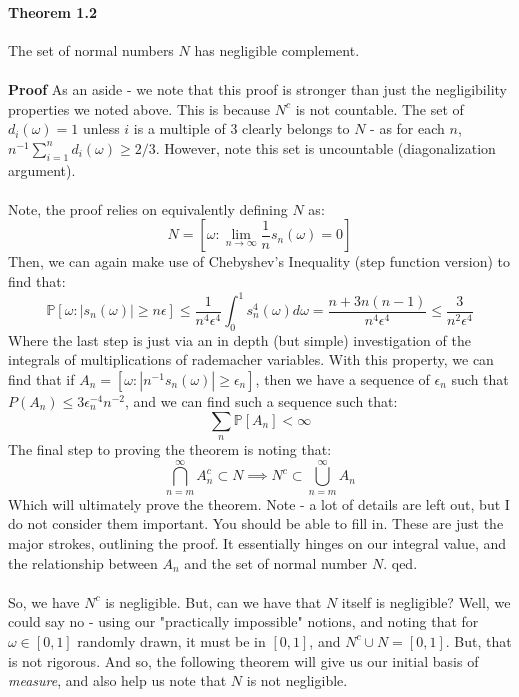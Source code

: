 \documentclass[12pt,a4paper]{article}
\newcommand{\1}[1]{\mathbbm{1}\left\{ #1 \right\}}
\newcommand{\Prob}{\mathbb{P}}
\begin{document}
\paragraph{Theorem 1.2} The set of normal numbers $N$ has negligible complement.
\\\\
\textbf{Proof} As an aside - we note that this proof is stronger than just the negligibility properties we noted above. This is because $N^c$ is not countable. The set of $d_i(\omega) = 1$ unless $i$ is a multiple of $3$ clearly belongs to $N$ - as for each $n$, $n^{-1}\sum_{i=1}^n d_i(\omega) \geq 2/3$. However, note this set is uncountable (diagonalization argument).
\\\\
Note, the proof relies on equivalently defining $N$ as:
$$
	N = \left[\omega : \lim_{n \to \infty} \frac{1}{n} s_n(\omega) = 0\right]
$$
Then, we can again make use of Chebyshev's Inequality (step function version) to find that:
$$
	\Prob\left[\omega : |s_n(\omega)| \geq n\epsilon\right] \leq 
	\frac{1}{n^4\epsilon^4}\int_0^1 s_n^4(\omega) d\omega =
	\frac{n + 3n(n-1)}{n^4\epsilon^4} \leq
	\frac{3}{n^2\epsilon^4}
$$
Where the last step is just via an in depth (but simple) investigation of the integrals of multiplications of rademacher variables. With this property, we can find that if $A_n = [\omega: |n^{-1}s_n(\omega)| \geq \epsilon_n]$, then we have a sequence of $\epsilon_n$ such that $P(A_n) \leq 3\epsilon_n^{-4}n^{-2}$, and we can find such a sequence such that:
$$
	\sum_n \Prob\left[A_n\right] < \infty
$$
The final step to proving the theorem is noting that:
$$
	\bigcap_{n = m}^\infty A_n^c \subset N \implies N^c \subset \bigcup_{n=m}^\infty A_n
$$
Which will ultimately prove the theorem. Note - a lot of details are left out, but I do not consider them important. You should be able to fill in. These are just the major strokes, outlining the proof. It essentially hinges on our integral value, and the relationship between $A_n$ and the set of normal number $N$. qed.
\\\\
So, we have $N^c$ is negligible. But, can we have that $N$ itself is negligible? Well, we could say no - using our "practically impossible" notions, and noting that for $\omega \in [0,1]$ randomly drawn, it must be in $[0,1]$, and $N^c \cup N = [0,1]$. But, that is not rigorous. And so, the following theorem will give us our initial basis of \textit{measure}, and also help us note that $N$ is not negligible.
\end{document}
